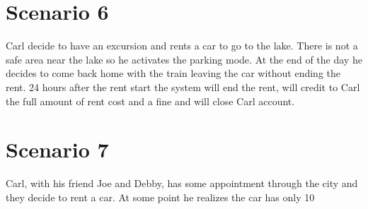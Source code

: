 \section{Scenario 6}
Carl decide to have an excursion and rents a car to go to the lake. There is not a safe area near the lake so he activates the parking mode. At the end of the day he decides to come back home with the train leaving the car without ending the rent. 24 hours after the rent start the system will end the rent, will credit to Carl the full amount of rent cost and a fine and will close Carl account.
\section{Scenario 7}
Carl, with his friend Joe and Debby, has some appointment through the city and they decide to rent a car. At some point he realizes the car has only 10%